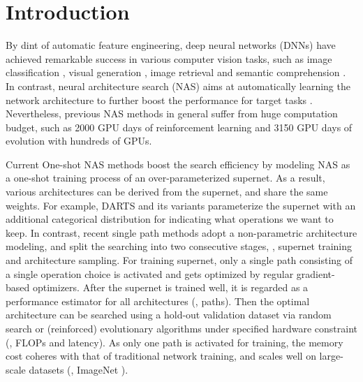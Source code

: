 \documentclass[10pt,twocolumn,letterpaper]{article}
\begin{document}
\section{Introduction}
By dint of automatic feature engineering, deep neural networks (DNNs) have achieved remarkable success in various computer vision tasks, such as image classification \cite{wang2017residual,wang2018devil,you2017learning,tang2019bringing,rebornfilters,fewdata,wu2019deep}, visual generation \cite{wang2018perceptual,wang2019evolutionary}, image retrieval \cite{yang2018shared,deng2019unsupervised,deng2019two,han2018attribute} and semantic comprehension \cite{liao2019ppdm,liao2019real}. In contrast, neural architecture search (NAS) aims at automatically learning the network architecture to further boost the performance for target tasks \cite{guo2019irlas,liu2018progressive,ZophL17,chen2019detnas,lin2019graph}. 
Nevertheless, previous NAS methods in general suffer from huge computation budget, such as 2000 GPU days of reinforcement learning \cite{ZophL17} and 3150 GPU days of evolution \cite{real2019regularized} with hundreds of GPUs. 

Current One-shot NAS methods boost the search efficiency by modeling NAS as a one-shot training process of an over-parameterized supernet. As a result, various architectures can be derived from the supernet, and share the same weights. For example, DARTS \cite{darts} and its variants 
\cite{fbnet,proxylessnas} parameterize the supernet with an additional categorical distribution for indicating what operations we want to keep. In contrast, recent single path methods adopt a non-parametric architecture modeling, and split the searching into two consecutive stages, \ie, supernet training and architecture sampling. For training supernet, only a single path consisting of a single operation choice is activated and gets optimized by regular gradient-based optimizers. After the supernet is trained well, it is regarded as a performance estimator for all architectures (\ie, paths). Then the optimal architecture can be searched using a hold-out validation dataset via random search \cite{random} or (reinforced) evolutionary  \cite{face++,fairnas} algorithms under specified hardware constraint (\eg, FLOPs and latency). As only one path is activated for training, the memory cost coheres with that of traditional network training, and scales well on large-scale datasets (\eg, ImageNet \cite{imagenet}). 
\end{document}
